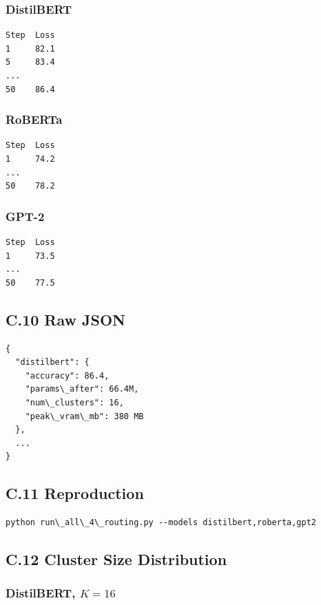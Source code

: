 \subsubsection{DistilBERT}

\begin{lstlisting}
Step  Loss
1     82.1
5     83.4
...
50    86.4
\end{lstlisting}

\subsubsection{RoBERTa}

\begin{lstlisting}
Step  Loss
1     74.2
...
50    78.2
\end{lstlisting}

\subsubsection{GPT-2}

\begin{lstlisting}
Step  Loss
1     73.5
...
50    77.5
\end{lstlisting}

\subsection{C.10 Raw JSON}

\begin{lstlisting}
{
  "distilbert": {
    "accuracy": 86.4,
    "params\_after": 66.4M,
    "num\_clusters": 16,
    "peak\_vram\_mb": 380 MB
  },
  ...
}
\end{lstlisting}

\subsection{C.11 Reproduction}

\begin{lstlisting}
python run\_all\_4\_routing.py --models distilbert,roberta,gpt2
\end{lstlisting}

\subsection{C.12 Cluster Size Distribution}

\subsubsection{DistilBERT, $K=16$}

